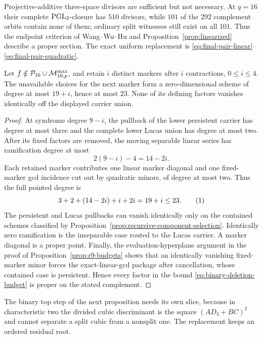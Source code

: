 Projective-additive three-space divisors are sufficient but not necessary.
At $q=16$ their complete $\operatorname{PGL}_2$-closure has $510$ divisors, while
$101$ of the $292$ complement orbits contain none of them; ordinary
split witnesses still exist on all $101$.  Thus the endpoint criterion of
Wang--Wu--Hu and Proposition~\ref{prop:linearized} describe a proper section.
The exact uniform replacement is
\eqref{eq:final-pair-linear}--\eqref{eq:final-pair-quadratic}.

\begin{proposition}\label{prop:r10-pointed-budgets}%
%
Let \(f\notin\mathcal P_{10}\cup\mathcal M^{\max}_{10,p}\), and retain \(i\) distinct
markers after \(i\) contractions, \(0\leq i\leq4\).  The unavailable
choices for the next marker form a zero-dimensional scheme of degree at
most \(19+i\), hence at most \(23\).  None of its defining factors vanishes identically off the
displayed carrier union.
\end{proposition}

\begin{proof}
At syndrome degree \(9-i\), the pullback of the lower persistent carrier
has degree at most three and the complete lower Lucas union has degree at
most two.  After its fixed factors are removed, the moving separable
linear series has ramification degree at most
\[
                         2(9-i)-4=14-2i.
\]
Each retained marker contributes one linear marker diagonal and one
fixed-marker gcd incidence cut out by quadratic minors, of degree at most
two.  Thus the full pointed degree is
\[
             3+2+(14-2i)+i+2i=19+i\leq23.
 \autoeqtag{eq:binary-deletion-budget}
\]
The persistent and Lucas pullbacks can vanish identically only on the
contained schemes classified by
Proposition~\ref{prop:recursive-component-selection}.  Identically zero
ramification is the inseparable case routed to the Lucas carrier.  A marker
diagonal is a proper point.  Finally, the evaluation-hyperplane argument in
the proof of Proposition~\ref{prop:r9-budgets} shows that an identically
vanishing fixed-marker minor forces the exact-linear-gcd package after
cancellation, whose contained case is persistent.  Hence every factor in
the bound \eqref{eq:binary-deletion-budget} is proper on the stated complement.
\end{proof}

The binary top step of the next proposition needs its own slice, because in
characteristic two the divided cubic discriminant is the square
$(AD_3+BC)^2$ and cannot separate a split cubic from a nonsplit one.  The
replacement keeps an ordered residual root.

